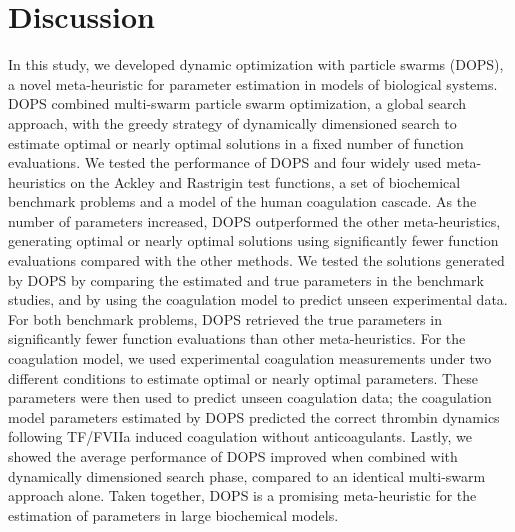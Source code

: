 \documentclass{bmcart}
\begin{document}
\section*{Discussion}
In this study, we developed dynamic optimization with particle swarms (DOPS), a novel meta-heuristic for parameter estimation in models of biological systems.
DOPS combined multi-swarm particle swarm optimization, a global search approach, with the greedy strategy of dynamically dimensioned search to estimate optimal or nearly optimal solutions in a fixed number of function evaluations. We tested the performance of DOPS and four widely used meta-heuristics on the Ackley and Rastrigin test functions, a set of biochemical benchmark problems and a model of the human coagulation cascade.
As the number of parameters increased, DOPS outperformed the other meta-heuristics, generating optimal or nearly optimal solutions using significantly fewer function evaluations compared with the other methods. We tested the solutions generated by DOPS by comparing the estimated and true parameters in the benchmark studies, and by using the coagulation model to predict unseen experimental data. For both benchmark problems, DOPS retrieved the true parameters in significantly fewer function evaluations than other meta-heuristics.
For the coagulation model, we used experimental coagulation measurements under two different conditions to estimate optimal or nearly optimal parameters.
These parameters were then used to predict unseen coagulation data;
the coagulation model parameters estimated by DOPS predicted the correct thrombin dynamics following TF/FVIIa induced coagulation without anticoagulants.
Lastly, we showed the average performance of DOPS improved when combined with dynamically dimensioned search phase, compared to an identical multi-swarm approach alone.
Taken together, DOPS is a promising meta-heuristic for the estimation of parameters in large biochemical models.

\end{document}
